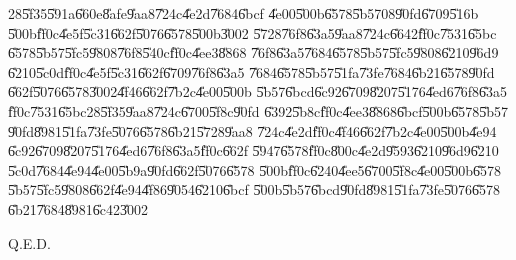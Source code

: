 \documentclass{article}
\begin{document}
28\U{5f35}\U{591a}\U{660e}\U{8afe}\U{9aa8}\U{724c}\U{4e2d}\U{7684}\U{6bcf}%
\U{4e00}\U{500b}\U{6578}\U{5b57}08\U{90fd}\U{6709}\U{516b}%
\U{500b}\U{ff0c}\U{4e5f}\U{5c31}\U{662f}\U{5076}\U{6578}\U{500b}\U{3002}%
\U{5728}\U{76f8}\U{63a5}\U{9aa8}\U{724c}\U{6642}\U{ff0c}\U{7531}\U{65bc}%
\U{6578}\U{5b57}\U{5fc5}\U{9808}\U{76f8}\U{540c}\U{ff0c}\U{4ee3}\U{8868}%
\U{76f8}\U{63a5}\U{7684}\U{6578}\U{5b57}\U{5fc5}\U{9808}\U{6210}\U{96d9}%
\U{6210}\U{5c0d}\U{ff0c}\U{4e5f}\U{5c31}\U{662f}\U{6709}\U{76f8}\U{63a5}%
\U{7684}\U{6578}\U{5b57}\U{51fa}\U{73fe}\U{7684}\U{6b21}\U{6578}\U{90fd}%
\U{662f}\U{5076}\U{6578}\U{3002}\U{4f46}\U{662f}\U{7b2c}\U{4e00}\U{500b}%
\U{5b57}\U{6bcd}\U{6c92}\U{6709}\U{8207}\U{5176}\U{4ed6}\U{76f8}\U{63a5}%
\U{ff0c}\U{7531}\U{65bc}28\U{5f35}\U{9aa8}\U{724c}\U{6700}\U{5f8c}\U{90fd}%
\U{6392}\U{5b8c}\U{ff0c}\U{4ee3}\U{8868}\U{6bcf}\U{500b}\U{6578}\U{5b57}%
\U{90fd}\U{8981}\U{51fa}\U{73fe}\U{5076}\U{6578}\U{6b21}\U{5728}\U{9aa8}%
\U{724c}\U{4e2d}\U{ff0c}\U{4f46}\U{662f}\U{7b2c}\U{4e00}\U{500b}\U{4e94}%
\U{6c92}\U{6709}\U{8207}\U{5176}\U{4ed6}\U{76f8}\U{63a5}\U{ff0c}\U{662f}%
\U{5947}\U{6578}\U{ff0c}\U{800c}\U{4e2d}\U{9593}\U{6210}\U{96d9}\U{6210}%
\U{5c0d}\U{7684}\U{4e94}\U{4e00}\U{5b9a}\U{90fd}\U{662f}\U{5076}\U{6578}%
\U{500b}\U{ff0c}\U{6240}\U{4ee5}\U{6700}\U{5f8c}\U{4e00}\U{500b}\U{6578}%
\U{5b57}\U{5fc5}\U{9808}\U{662f}\U{4e94}\U{4f86}\U{9054}\U{6210}\U{6bcf}%
\U{500b}\U{5b57}\U{6bcd}\U{90fd}\U{8981}\U{51fa}\U{73fe}\U{5076}\U{6578}%
\U{6b21}\U{7684}\U{8981}\U{6c42}\U{3002}

Q.E.D.
\end{document}
